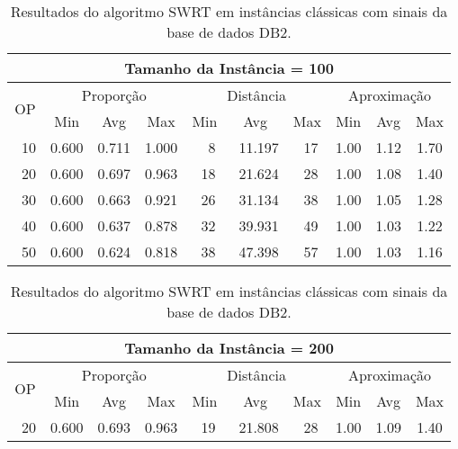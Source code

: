 \begin{table}[htbp]
\caption{Resultados do algoritmo SWRT em instâncias clássicas com sinais da base de dados DB2.}
\label{table:GZLFZWZB}
\begin{center}
\scriptsize
{\def\arraystretch{1.05}\tabcolsep=8pt
\begin{tabular}{|c|c|c|c|c|c|c|c|c|c|}
\hline
\multicolumn{10}{|c|}{\bf Tamanho da Instância = 100}                                                                          \\ \hline
\multirow{2}{*}{OP} & \multicolumn{3}{c|}{Proporção} & \multicolumn{3}{c|}{Distância} & \multicolumn{3}{c|}{Aproximação}   \\ \cline{2-10}
                    & Min       & Avg      & Max      & Min      & Avg      & Max     & Min     & Avg    & Max             \\ \hline
~10                 & 0.600     & 0.711    & 1.000    & ~~8      & ~11.197  & ~17     & 1.00    & 1.12   & 1.70            \\ \hline
~20                 & 0.600     & 0.697    & 0.963    & ~18      & ~21.624  & ~28     & 1.00    & 1.08   & 1.40            \\ \hline
~30                 & 0.600     & 0.663    & 0.921    & ~26      & ~31.134  & ~38     & 1.00    & 1.05   & 1.28            \\ \hline
~40                 & 0.600     & 0.637    & 0.878    & ~32      & ~39.931  & ~49     & 1.00    & 1.03   & 1.22            \\ \hline
~50                 & 0.600     & 0.624    & 0.818    & ~38      & ~47.398  & ~57     & 1.00    & 1.03   & 1.16            \\ \hline
\end{tabular}%
\vspace{5pt}
\begin{tabular}{|c|c|c|c|c|c|c|c|c|c|}
\hline
\multicolumn{10}{|c|}{\bf Tamanho da Instância = 200}                                                                          \\ \hline
\multirow{2}{*}{OP} & \multicolumn{3}{c|}{Proporção} & \multicolumn{3}{c|}{Distância} & \multicolumn{3}{c|}{Aproximação}   \\ \cline{2-10}
                    & Min       & Avg      & Max      & Min      & Avg      & Max     & Min     & Avg    & Max             \\ \hline
~20                 & 0.600     & 0.693    & 0.963    & ~19      & ~21.808  & ~28     & 1.00    & 1.09   & 1.40            \\ \hline

\end{tabular}}
\end{center}
\end{table}
